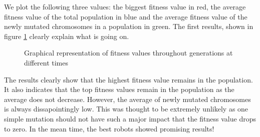 \documentclass[a4paper,10pt]{article}
\begin{document}
We plot the following three values: the biggest fitness value in red, the average fitness value of the total population in blue and the average fitness value of the 
newly mutated chromosomes in a population in green. The first results, shown in figure \ref{fig:result_1} clearly explain what is going on.\\

\begin{figure}[h!]
  \centering
  \caption{Graphical representation of fitness values throughout generations at different times}
  \label{fig:result_1}
\end{figure}

The results clearly show that the highest fitness value remains in the population. It also indicates that the top fitness values remain in the population as the average
does not decrease. However, the average of newly mutated chromosomes is always dissapointingly low. This was thought to be extremely unlikely as one simple mutation should
not have such a major impact that the fitness value drops to zero. In the mean time, the best robots showed promising results! \\
\end{document}
